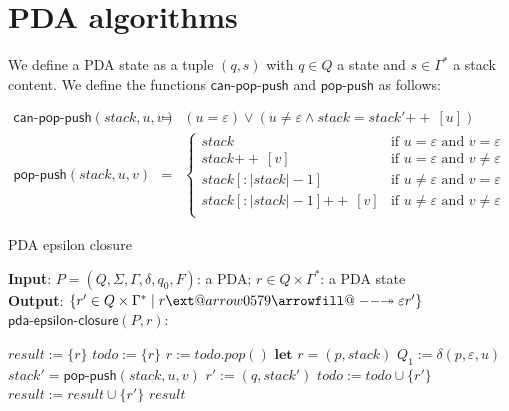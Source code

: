 \documentclass[11pt]{article}
\makeatletter
\newcommand{\concat}{\ensuremath{+\!\!+\:}}
\providecommand*{\twoheadrightarrowfill@}{%
  \arrowfill@\relbar\relbar\twoheadrightarrow
}
\providecommand*{\xtwoheadrightarrow}[2][]{%
  \ext@arrow 0579\twoheadrightarrowfill@{#1}{#2}%
}
\makeatother
\begin{document}
\clearpage

\section{PDA algorithms}

We define a PDA state as a tuple $(q, s)$ with $q \in Q$ a state and $s \in \Gamma^*$ a stack content. We define the functions $\textsf{can-pop-push}$ and $\textsf{pop-push}$ as follows:

\[
\begin{array}{lll}
\textsf{can-pop-push}(stack, u, v) &=& (u = \varepsilon) \lor 
                (u \neq \varepsilon \land stack = stack' \concat [u] )\\
\textsf{pop-push}(stack, u, v) &=& 
  \left \{
    \begin{array}{ll}
      stack & \text{if } u = \varepsilon \text{ and } v = \varepsilon \\
      stack \concat [v] & \text{if } u = \varepsilon \text{ and } v \neq \varepsilon \\
      stack[{:}|stack|{-}1] & \text{if } u \neq \varepsilon \text{ and } v = \varepsilon \\
      stack[{:}|stack|{-}1] \concat [v] & \text{if } u \neq \varepsilon \text{ and } v \neq \varepsilon \\
    \end{array}
  \right .
\end{array}
\]

\begin{algorithm}
\small
\caption{PDA epsilon closure}
\vspace*{1ex}
{\textbf{Input}:}
$P = (Q, \Sigma, \Gamma, \delta, q_0, F)$: a PDA; $r \in Q \times \Gamma^*$: a PDA state \\
{\textbf{Output}:}
$\{ r' \in Q \times \Gamma^* \mid r \xtwoheadrightarrow{\varepsilon} r' \}$ \\

$\textsf{pda-epsilon-closure}(P, r)$:
\begin{algorithmic}[1]
\State $result := \{ r \}$
\State $todo := \{ r \}$
  \State $r := todo.pop()$ 
  \State $\textbf{let } r = (p, stack)$
    \State $Q_1 := \delta(p, \varepsilon, u)$
        \State $stack' = \textsf{pop-push}(stack, u, v)$
        \State $r' := (q, stack')$
          \State $todo := todo \cup \{ r' \}$
          \State $result := result \cup \{ r' \}$
        \EndIf
      \EndIf
    \EndFor
  \EndFor
\EndWhile
\State \Return $result$
\end{algorithmic}
\end{algorithm}
\end{document}
